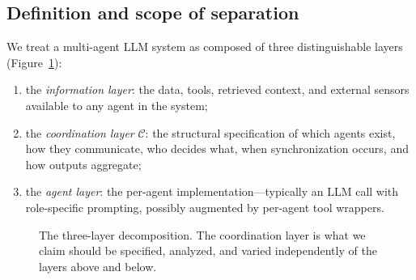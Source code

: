 \documentclass[11pt]{article}
\newcommand{\layer}{\mathcal{C}}
\begin{document}
\subsection{Definition and scope of separation}
\label{sec:layer-defn}

We treat a multi-agent LLM system as composed of three distinguishable layers (Figure~\ref{fig:stack}):

\begin{enumerate}
\item the \emph{information layer}: the data, tools, retrieved context, and external sensors available to any agent in the system;
\item the \emph{coordination layer} $\layer$: the structural specification of which agents exist, how they communicate, who decides what, when synchronization occurs, and how outputs aggregate;
\item the \emph{agent layer}: the per-agent implementation---typically an LLM call with role-specific prompting, possibly augmented by per-agent tool wrappers.
\end{enumerate}

\begin{figure}[h]
\centering
{}
\caption{The three-layer decomposition. The coordination layer is what we claim should be specified, analyzed, and varied independently of the layers above and below.}
\label{fig:stack}
\end{figure}
\end{document}
